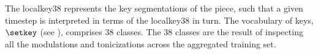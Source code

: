 
The \gls{localkey38} represents the key segmentations of the
piece, such that a given timestep is interpreted in terms of
the \gls{localkey38} in turn. 
The vocabulary of keys, $\setkey$ (see
), comprises 38 classes.
The 38 classes are the result of inspecting all the
modulations and tonicizations across the aggregated training
set.
